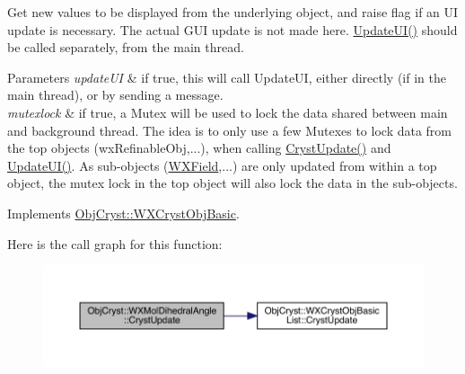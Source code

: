 Get new values to be displayed from the underlying object, and raise flag if an UI update is necessary. The actual G\+UI update is not made here. \mbox{\hyperlink{class_obj_cryst_1_1_w_x_mol_dihedral_angle_a6c959c830c79de8bdc253088c5593b5f}{Update\+U\+I()}} should be called separately, from the main thread.


\begin{DoxyParams}{Parameters}
{\em update\+UI} & if true, this will call Update\+UI, either directly (if in the main thread), or by sending a message. \\
\hline
{\em mutexlock} & if true, a Mutex will be used to lock the data shared between main and background thread. The idea is to only use a few Mutexes to lock data from the top objects (wx\+Refinable\+Obj,...), when calling \mbox{\hyperlink{class_obj_cryst_1_1_w_x_mol_dihedral_angle_a5bd5d650acff2a6a749bab3842044b02}{Cryst\+Update()}} and \mbox{\hyperlink{class_obj_cryst_1_1_w_x_mol_dihedral_angle_a6c959c830c79de8bdc253088c5593b5f}{Update\+U\+I()}}. As sub-\/objects (\mbox{\hyperlink{class_obj_cryst_1_1_w_x_field}{W\+X\+Field}},...) are only updated from within a top object, the mutex lock in the top object will also lock the data in the sub-\/objects. \\
\hline
\end{DoxyParams}


Implements \mbox{\hyperlink{class_obj_cryst_1_1_w_x_cryst_obj_basic_a7ac00ae2ae28f1a6fa26e6fa571186b6}{Obj\+Cryst\+::\+W\+X\+Cryst\+Obj\+Basic}}.

Here is the call graph for this function\+:
\nopagebreak
\begin{figure}[H]
\begin{center}
\leavevmode
\includegraphics[width=350pt]{class_obj_cryst_1_1_w_x_mol_dihedral_angle_a5bd5d650acff2a6a749bab3842044b02_cgraph}
\end{center}
\end{figure}
\mbox{\label{class_obj_cryst_1_1_w_x_mol_dihedral_angle_a6c959c830c79de8bdc253088c5593b5f}} 
